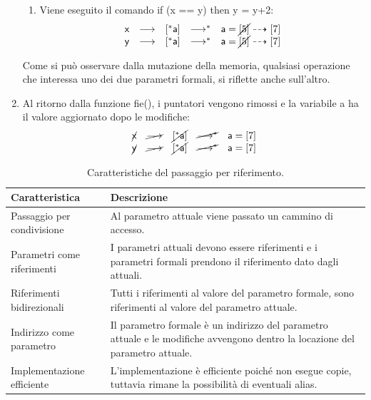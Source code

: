 \documentclass[a4paper]{article}
\begin{document}
\begin{enumerate}
\begin{enumerate}
			\item Viene eseguito il comando \textsf{if (x == y) then y = y+2}:
			\begin{equation*}
				\begin{array}{lllll}
					\textsf{x} &\longrightarrow& \left[^{*} \textsf{a}\right] &\longrightarrow^{*}& \textsf{a} = \cancel{\left[5\right]} \dashrightarrow \left[7\right] \\
					\textsf{y} &\longrightarrow& \left[^{*} \textsf{a}\right] &\longrightarrow^{*}& \textsf{a} = \cancel{\left[5\right]} \dashrightarrow \left[7\right]
				\end{array}
			\end{equation*}
		\end{enumerate}
		Come si può osservare dalla mutazione della memoria, qualsiasi operazione che interessa uno dei due parametri formali, si riflette anche sull'altro.
		
		\item Al ritorno dalla funzione \textsf{fie()}, i puntatori vengono rimossi e la variabile \textsf{a} ha il valore aggiornato dopo le modifiche:
		\begin{equation*}
			\begin{array}{lllll}
				\cancel{\textsf{x}} &\cancel{\longrightarrow}& \cancel{\left[^{*} \textsf{a}\right]} &\cancel{\longrightarrow^{*}}& \textsf{a} = \left[7\right] \\
				\cancel{\textsf{y}} &\cancel{\longrightarrow}& \cancel{\left[^{*} \textsf{a}\right]} &\cancel{\longrightarrow^{*}}& \textsf{a} = \left[7\right]
			\end{array}
		\end{equation*}
	\end{enumerate}\newpage
	
	\begin{table}[!htp]
		\centering
		\begin{tabular}{@{} l p{19em} @{}}
			\toprule
			Caratteristica & Descrizione \\
			\midrule
			Passaggio per condivisione	& Al parametro attuale viene passato un cammino di accesso. \\ [0.5em]
			Parametri come riferimenti	& I parametri attuali devono essere riferimenti e i parametri formali prendono il riferimento dato dagli attuali. \\ [0.5em]
			Riferimenti bidirezionali	& Tutti i riferimenti al valore del parametro formale, sono riferimenti al valore del parametro attuale. \\ [0.5em]
			Indirizzo come parametro	& Il parametro formale è un indirizzo del parametro attuale e le modifiche avvengono dentro la locazione del parametro attuale. \\ [0.5em]
			Implementazione efficiente	& L'implementazione è efficiente poiché non esegue copie, tuttavia rimane la possibilità di eventuali alias. \\
			\bottomrule
		\end{tabular}
		\caption{Caratteristiche del passaggio per riferimento.}
	\end{table}\newpage
	
\end{document}
